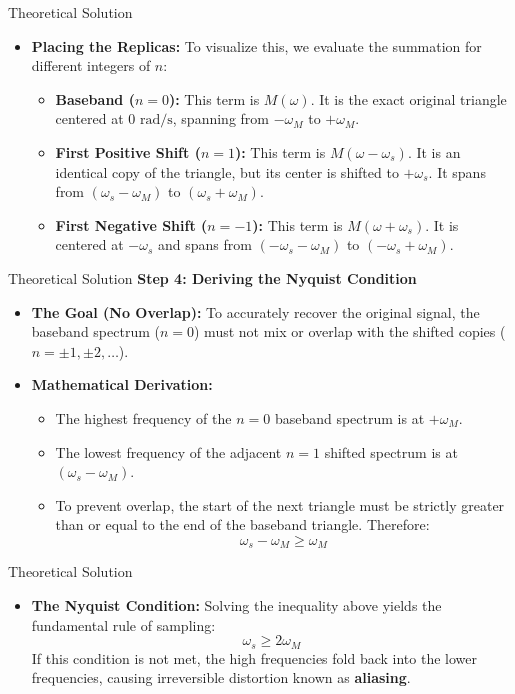 \documentclass{beamer}
\begin{document}
\begin{frame}{Theoretical Solution}
\begin{itemize}
    \item \textbf{Placing the Replicas:} To visualize this, we evaluate the summation for different integers of $n$:
    \begin{itemize}
        \item \textbf{Baseband ($n=0$):} This term is $M(\omega)$. It is the exact original triangle centered at $0 \text{ rad/s}$, spanning from $-\omega_M$ to $+\omega_M$.
        \item \textbf{First Positive Shift ($n=1$):} This term is $M(\omega - \omega_s)$. It is an identical copy of the triangle, but its center is shifted to $+\omega_s$. It spans from $(\omega_s - \omega_M)$ to $(\omega_s + \omega_M)$.
        \item \textbf{First Negative Shift ($n=-1$):} This term is $M(\omega + \omega_s)$. It is centered at $-\omega_s$ and spans from $(-\omega_s - \omega_M)$ to $(-\omega_s + \omega_M)$.
    \end{itemize}
\end{itemize}
\end{frame}

\begin{frame}{Theoretical Solution}
\textbf{Step 4: Deriving the Nyquist Condition}
\begin{itemize}
    \item \textbf{The Goal (No Overlap):} To accurately recover the original signal, the baseband spectrum ($n=0$) must not mix or overlap with the shifted copies ($n=\pm 1, \pm 2, \dots$).
    \item \textbf{Mathematical Derivation:} 
    \begin{itemize}
        \item The highest frequency of the $n=0$ baseband spectrum is at $+\omega_M$.
        \item The lowest frequency of the adjacent $n=1$ shifted spectrum is at $(\omega_s - \omega_M)$.
        \item To prevent overlap, the start of the next triangle must be strictly greater than or equal to the end of the baseband triangle. Therefore:
        \[
        \omega_s - \omega_M \ge \omega_M
        \]
    \end{itemize}
\end{itemize}
\end{frame}

\begin{frame}{Theoretical Solution}
\begin{itemize}
    \item \textbf{The Nyquist Condition:} Solving the inequality above yields the fundamental rule of sampling:
    \[
    \omega_s \ge 2\omega_M
    \]
    If this condition is not met, the high frequencies fold back into the lower frequencies, causing irreversible distortion known as \textbf{aliasing}.
\end{itemize}
\end{frame}
\end{document}
